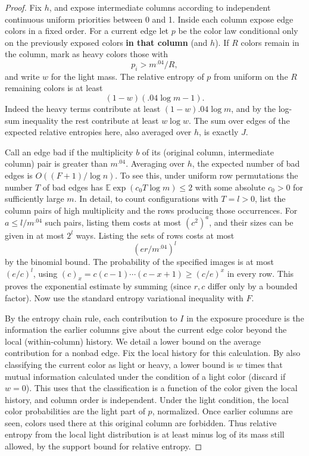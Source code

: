 \begin{proof}\label{tra:conditional:conditional-entropy-proof}
Fix \(h\), and expose intermediate columns according to independent continuous uniform priorities between 0 and 1. Inside each column expose edge colors in a fixed order. For a current edge let \(p\) be the color law conditional only on the previously exposed colors \textbf{in that column} (and \(h\)). If \(R\) colors remain in the column, mark as heavy colors those with
\[
                               p_i>m^{.04}/R,
\]
and write \(w\) for the light mass. The relative entropy of \(p\) from uniform on the \(R\) remaining colors is at least
\[
                   (1-w)(.04\log m-1).
\]
Indeed the heavy terms contribute at least \((1-w).04\log m\), and by the log-sum inequality the rest contribute at least \(w\log w\). The sum over edges of the expected relative entropies here, also averaged over \(h\), is exactly \(J\).

Call an edge bad if the multiplicity \(b\) of its (original column, intermediate column) pair is greater than \(m^{.04}\). Averaging over \(h\), the expected number of bad edges is \(O((F+1)/\log n)\). To see this, under uniform row permutations the number \(T\) of bad edges has \(\mathbb E\exp(c_0 T\log m)\le2\) with some absolute \(c_0>0\) for sufficiently large \(m\). In detail, to count configurations with \(T=l>0\), list the column pairs of high multiplicity and the rows producing those occurrences. For \(a\le l/m^{.04}\) such pairs, listing them costs at most \((c^2)^a\), and their sizes can be given in at most \(2^l\) ways. Listing the sets of rows costs at most
\[
                            (er/m^{.04})^l
\]
by the binomial bound. The probability of the specified images is at most \((e/c)^l\), using \((c)_x=c(c-1)\cdots(c-x+1)\ge(c/e)^x\) in every row. This proves the exponential estimate by summing (since \(r,c\) differ only by a bounded factor). Now use the standard entropy variational inequality with \(F\).

By the entropy chain rule, each contribution to \(I\) in the exposure procedure is the information the earlier columns give about the current edge color beyond the local (within-column) history. We detail a lower bound on the average contribution for a nonbad edge. Fix the local history for this calculation. By also classifying the current color as light or heavy, a lower bound is \(w\) times that mutual information calculated under the condition of a light color (discard if \(w=0\)). This uses that the classification is a function of the color given the local history, and column order is independent. Under the light condition, the local color probabilities are the light part of \(p\), normalized. Once earlier columns are seen, colors used there at this original column are forbidden. Thus relative entropy from the local light distribution is at least minus log of its mass still allowed, by the support bound for relative entropy.


\end{proof}
